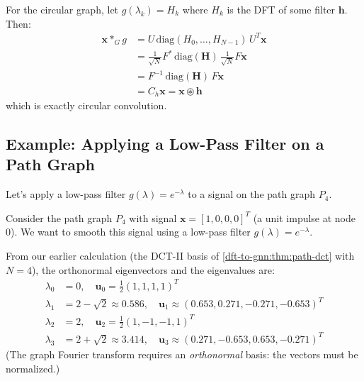 \begin{notechapter}
\begin{example}
For the circular graph, let $g(\lambda_k) = H_k$ where $H_k$ is the 
DFT of some filter $\mathbf{h}$. Then:
\begin{align*}
\mathbf{x} *_G g &= U \, \text{diag}(H_0, \ldots, H_{N-1}) \, U^T \mathbf{x} \\
&= \frac{1}{\sqrt{N}} F^* \, \text{diag}(\mathbf{H}) \, 
   \frac{1}{\sqrt{N}} F \mathbf{x} \\
&= F^{-1} \, \text{diag}(\mathbf{H}) \, F \mathbf{x} \\
&= C_h \mathbf{x} = \mathbf{x} \circledast \mathbf{h}
\end{align*}
which is exactly circular convolution.
\end{example}

\subsection{Example: Applying a Low-Pass Filter on a Path Graph}

Let's apply a low-pass filter $g(\lambda) = e^{-\lambda}$ to a signal 
on the path graph $P_4$.

\begin{example}
Consider the path graph $P_4$ with signal $\mathbf{x} = [1, 0, 0, 0]^T$ 
(a unit impulse at node 0). We want to smooth this signal using a 
low-pass filter $g(\lambda) = e^{-\lambda}$.

From our earlier calculation (the DCT-II basis of \cref{dft-to-gnn:thm:path-dct} with $N = 4$), the
orthonormal eigenvectors and the eigenvalues are:
\begin{align*}
\lambda_0 &= 0, \quad \mathbf{u}_0 = \tfrac{1}{2}(1, 1, 1, 1)^T \\
\lambda_1 &= 2 - \sqrt{2} \approx 0.586, \quad \mathbf{u}_1 \approx (0.653, 0.271, -0.271, -0.653)^T \\
\lambda_2 &= 2, \quad \mathbf{u}_2 = \tfrac{1}{2}(1, -1, -1, 1)^T \\
\lambda_3 &= 2 + \sqrt{2} \approx 3.414, \quad \mathbf{u}_3 \approx (0.271, -0.653, 0.653, -0.271)^T
\end{align*}
(The graph Fourier transform requires an \emph{orthonormal} basis: the vectors must be normalized.)


\end{example}
\end{notechapter}

